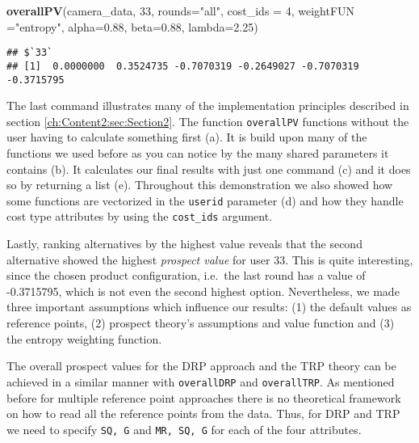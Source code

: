 \documentclass[]{article}
\newenvironment{Shaded}{\begin{snugshade}}{\end{snugshade}}
\newcommand{\KeywordTok}[1]{\textcolor[rgb]{0.13,0.29,0.53}{\textbf{{#1}}}}
\newcommand{\DataTypeTok}[1]{\textcolor[rgb]{0.13,0.29,0.53}{{#1}}}
\newcommand{\DecValTok}[1]{\textcolor[rgb]{0.00,0.00,0.81}{{#1}}}
\newcommand{\FloatTok}[1]{\textcolor[rgb]{0.00,0.00,0.81}{{#1}}}
\newcommand{\StringTok}[1]{\textcolor[rgb]{0.31,0.60,0.02}{{#1}}}
\newcommand{\NormalTok}[1]{{#1}}
\begin{document}
\begin{Shaded}
\begin{Highlighting}[]
\KeywordTok{overallPV}\NormalTok{(camera_data, }\DecValTok{33}\NormalTok{, }\DataTypeTok{rounds=}\StringTok{"all"}\NormalTok{, }\DataTypeTok{cost_ids =} \DecValTok{4}\NormalTok{, }\DataTypeTok{weightFUN =}\StringTok{"entropy"}\NormalTok{,}
          \DataTypeTok{alpha=}\FloatTok{0.88}\NormalTok{, }\DataTypeTok{beta=}\FloatTok{0.88}\NormalTok{, }\DataTypeTok{lambda=}\FloatTok{2.25}\NormalTok{)}
\end{Highlighting}
\end{Shaded}

\begin{verbatim}
## $`33`
## [1]  0.0000000  0.3524735 -0.7070319 -0.2649027 -0.7070319 -0.3715795
\end{verbatim}

The last command illustrates many of the implementation principles
described in section \ref{ch:Content2:sec:Section2}. The function
\texttt{overallPV} functions without the user having to calculate
something first (a). It is build upon many of the functions we used
before as you can notice by the many shared parameters it contains (b).
It calculates our final results with just one command (c) and it does so
by returning a list (e). Throughout this demonstration we also showed
how some functions are vectorized in the \texttt{userid} parameter (d)
and how they handle cost type attributes by using the \texttt{cost\_ids}
argument.

Lastly, ranking alternatives by the highest value reveals that the
second alternative showed the highest \emph{prospect value} for user 33.
This is quite interesting, since the chosen product configuration,
i.e.~the last round has a value of -0.3715795, which is not even the
second highest option. Nevertheless, we made three important assumptions
which influence our results: (1) the default values as reference points,
(2) prospect theory's assumptions and value function and (3) the entropy
weighting function.

The overall prospect values for the DRP approach and the TRP theory can
be achieved in a similar manner with \texttt{overallDRP} and
\texttt{overallTRP}. As mentioned before for multiple reference point
approaches there is no theoretical framework on how to read all the
reference points from the data. Thus, for DRP and TRP we need to specify
\texttt{SQ, G} and \texttt{MR, SQ, G} for each of the four attributes.
\end{document}
